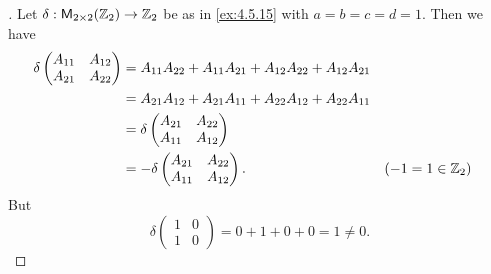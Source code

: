 \begin{proof}[]
	Let \(\delta : \mathsf{M}_{{2} \times 2}({\mathbb{Z}_2}) \to \mathbb{Z}_2\) be as in \cref{ex:4.5.15} with \(a = b = c = d = 1\).
	Then we have
	\begin{align*}
		\delta\begin{pmatrix}
			      A_{1 1} & A_{1 2} \\
			      A_{2 1} & A_{2 2}
		      \end{pmatrix} & = A_{1 1} A_{2 2} + A_{1 1} A_{2 1} + A_{1 2} A_{2 2} + A_{1 2} A_{2 1}                         \\
		                      & = A_{2 1} A_{1 2} + A_{2 1} A_{1 1} + A_{2 2} A_{1 2} + A_{2 2} A_{1 1}                       \\
		                      & = \delta\begin{pmatrix}
			                                A_{2 1} & A_{2 2} \\
			                                A_{1 1} & A_{1 2}
		                                \end{pmatrix}                                                                     \\
		                      & = -\delta\begin{pmatrix}
			                                 A_{2 1} & A_{2 2} \\
			                                 A_{1 1} & A_{1 2}
		                                 \end{pmatrix}.                                                &  & (-1 = 1 \in \mathbb{Z}_2)
	\end{align*}
	But
	\[
		\delta\begin{pmatrix}
			1 & 0 \\
			1 & 0
		\end{pmatrix} = 0 + 1 + 0 + 0 = 1 \neq 0.
	\]
\end{proof}

